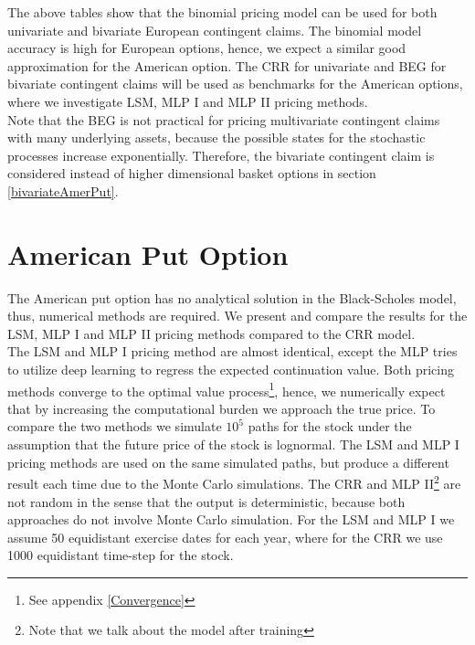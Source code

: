 The above tables show that the binomial pricing model can be used for both univariate and bivariate European contingent claims. The binomial model accuracy is high for European options, hence, we expect a similar good approximation for the American option. The CRR for univariate and BEG for bivariate contingent claims will be used as benchmarks for the American options, where we investigate LSM, MLP I and MLP II pricing methods. \\

Note that the BEG is not practical for pricing multivariate contingent claims with many underlying assets, because the possible states for the stochastic processes increase exponentially. Therefore, the bivariate contingent claim is considered instead of higher dimensional basket options in section \ref{bivariateAmerPut}.
\section{American Put Option}
The American put option has no analytical solution in the Black-Scholes model, thus, numerical methods are required. We present and compare the results for the LSM, MLP I and MLP II pricing methods compared to the CRR model.\\

The LSM and MLP I pricing method are almost identical, except the MLP tries to utilize deep learning to regress the expected continuation value. Both pricing methods converge to the optimal value process\footnote{See appendix \ref{Convergence}}, hence, we numerically expect that by increasing the computational burden we approach the true price. To compare the two methods we simulate $10^5$ paths for the stock under the assumption that the future price of the stock is lognormal. The LSM and MLP I pricing methods are used on the same simulated paths, but produce a different result each time due to the Monte Carlo simulations. The CRR and MLP II\footnote{Note that we talk about the model after training} are not random in the sense that the output is deterministic, because both approaches do not involve Monte Carlo simulation. For the LSM and MLP I we assume 50 equidistant exercise dates for each year, where for the CRR we use 1000 equidistant time-step for the stock.  \\

